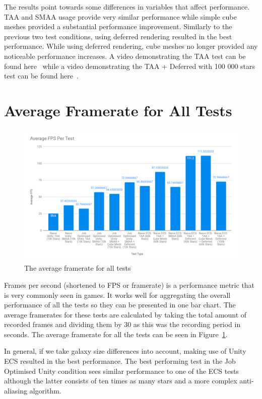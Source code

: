 The results point towards some differences in variables that affect performance. TAA and SMAA usage provide very similar performance while simple cube meshes provided a substantial performance improvement. Similarly to the previous two test conditions, using deferred rendering resulted in the best performance. While using deferred rendering, cube meshes no longer provided any noticeable performance increases. A video demonstrating the TAA test can be found here~\cite{naiveECSVideo} while a video demonstrating the TAA + Deferred with 100 000 stars test can be found here~\cite{naiveECSVideo100k}.

\section{Average Framerate for All Tests}
\begin{figure}[!p]
    \centering
    \includegraphics[width=1\textwidth]{Figures/averageFpsPerTest.png}
    \caption[Average Framerate Per Test]{The average framerate for all tests}
    \label{fig:averageFPS}
\end{figure}

Frames per second (shortened to FPS or framerate) is a performance metric that is very commonly seen in games. It works well for aggregating the overall performance of all the tests so they can be presented in one bar chart. The average framerates for these tests are calculated by taking the total amount of recorded frames and dividing them by 30 as this was the recording period in seconds. The average framerate for all the tests can be seen in Figure~\ref{fig:averageFPS}. 

In general, if we take galaxy size differences into account, making use of Unity ECS resulted in the best performance. The best performing test in the Job Optimised Unity condition sees similar performance to one of the ECS tests although the latter consists of ten times as many stars and a more complex anti-aliasing algorithm. 
